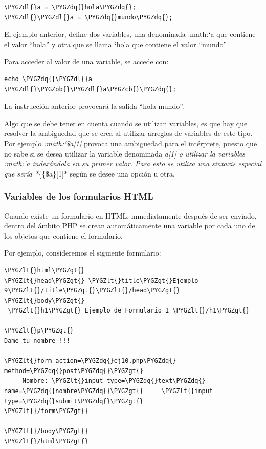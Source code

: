 \documentclass[a5paper,10pt,spanish]{sphinxmanual}
\def\PYGZob{\char`\{}
\def\PYGZcb{\char`\}}
\def\PYGZlt{\char`\<}
\def\PYGZgt{\char`\>}
\def\PYGZdl{\char`\$}
\def\PYGZdq{\char`\"}
\begin{document}
\begin{Verbatim}[commandchars=\\\{\}]
\PYGZdl{}a = \PYGZdq{}hola\PYGZdq{};
\PYGZdl{}\PYGZdl{}a = \PYGZdq{}mundo\PYGZdq{};
\end{Verbatim}

El ejemplo anterior, define dos variables, una denominada
:math:{\color{red}\bfseries{}{}`}a que contiene el valor ``hola'' y otra que se llama {\color{red}\bfseries{}{}`}hola que
contiene el valor ``mundo''

Para acceder al valor de una variable, se accede con:

\begin{Verbatim}[commandchars=\\\{\}]
echo \PYGZdq{}\PYGZdl{}a \PYGZdl{}\PYGZob{}\PYGZdl{}a\PYGZcb{}\PYGZdq{};
\end{Verbatim}

La instrucción anterior provocará la salida ``hola mundo''.

Algo que se debe tener en cuenta cuando se utilizan variables, es que
hay que resolver la ambiguedad que se crea al utilizar arreglos de
variables de este tipo. Por ejemplo
\emph{:math:{}`\$a{[}1{]}} provoca una ambiguedad para el intérprete, puesto que no sabe si se desea utilizar la variable denominada \emph{a{[}1{]}
o utilizar la variables
:math:{}`a indexándola en su primer valor. Para esto se utiliza una sintaxis especial que sería *}\{\{\$a\}{[}1{]}*
según se desee una opción u otra.


\subsubsection{Variables de los formularios HTML}
\label{Tutorial1_Conceptos.md:variables-de-los-formularios-html}
Cuando existe un formulario en HTML, inmediatamente después de ser
enviado, dentro del ámbito PHP se crean automáticamente una variable por
cada uno de los objetos que contiene el formulario.

Por ejemplo, consideremos el siguiente formulario:

\begin{Verbatim}[commandchars=\\\{\}]
\PYGZlt{}html\PYGZgt{}
\PYGZlt{}head\PYGZgt{} \PYGZlt{}title\PYGZgt{}Ejemplo 9\PYGZlt{}/title\PYGZgt{}\PYGZlt{}/head\PYGZgt{}
\PYGZlt{}body\PYGZgt{}
 \PYGZlt{}h1\PYGZgt{} Ejemplo de Formulario 1 \PYGZlt{}/h1\PYGZgt{}

\PYGZlt{}p\PYGZgt{}
Dame tu nombre !!!

\PYGZlt{}form action=\PYGZdq{}ej10.php\PYGZdq{} method=\PYGZdq{}post\PYGZdq{}\PYGZgt{}
     Nombre: \PYGZlt{}input type=\PYGZdq{}text\PYGZdq{} name=\PYGZdq{}nombre\PYGZdq{}\PYGZgt{}     \PYGZlt{}input type=\PYGZdq{}submit\PYGZdq{}\PYGZgt{}
\PYGZlt{}/form\PYGZgt{}

\PYGZlt{}/body\PYGZgt{}
\PYGZlt{}/html\PYGZgt{}
\end{Verbatim}
\end{document}
